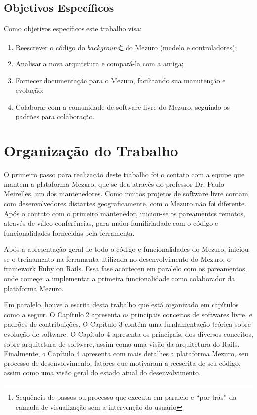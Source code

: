 \subsection{Objetivos Específicos}

Como objetivos específicos este trabalho visa:

\begin{enumerate}
\item Reescrever o código do \textit{background}\footnote{Sequência de passos ou processo que executa em paralelo e ``por trás'' da camada de visualização sem a intervenção do usuário} do Mezuro (modelo e controladores);
\item Analisar a nova arquitetura e compará-la com a antiga;
\item Fornecer documentação para o Mezuro, facilitando sua manutenção e evolução;
\item Colaborar com a comunidade de software livre do Mezuro, seguindo os padrões para colaboração.
\end{enumerate}

\section{Organização do Trabalho}

O primeiro passo para realização deste trabalho foi o contato com a equipe que mantem a plataforma Mezuro, que se deu através do professor Dr. Paulo Meirelles, um dos mantenedores. Como muitos projetos de software livre contam com desenvolvedores distantes geograficamente, com o Mezuro não foi diferente. Após o contato com o primeiro mantenedor, iniciou-se os pareamentos remotos, através de vídeo-conferências, para maior familiriadade com o código e funcionalidades fornecidas pela ferramenta.

Após a apresentação geral de todo o código e funcionalidades do Mezuro, iniciou-se o treinamento na ferramenta utilizada no desenvolvimento do Mezuro, o framework Ruby on Rails. Essa fase aconteceu em paralelo com os pareamentos, onde começei a implementar a primeira funcionalidade como colaborador da plataforma Mezuro.

Em paralelo, houve a escrita desta trabalho que está organizado em capítulos como a seguir. O Capítulo 2 apresenta os principais conceitos de softwares livre, e padrões de contribuições. O Capítulo 3 contém uma fundamentação teórica sobre evolução de software. O Capítulo 4 apresenta os principais, dos diversos conceitos, sobre arquitetura de software, assim como uma visão da arquitetura do Rails. Finalmente, o Capítulo 4 apresenta com mais detalhes a plataforma Mezuro, seu processo de desenvolvimento, fatores que motivaram a reescrita de seu código, assim como uma visão geral do estado atual do desenvolvimento.

